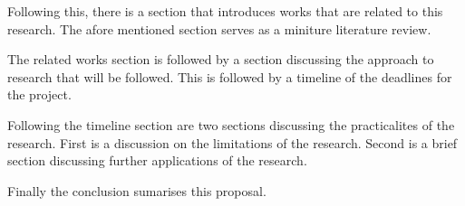   Following this, there is a section that introduces works that are related to this research.
  The afore mentioned section serves as a miniture literature review. 

  The related works section is followed by a section discussing the approach to research that will be followed.
  This is followed by a timeline of the deadlines for the project.

  Following the timeline section are two sections discussing the practicalites of the research.
  First is a discussion on the limitations of the research.
  Second is a brief section discussing further applications of the research.

  Finally the conclusion sumarises this proposal.
